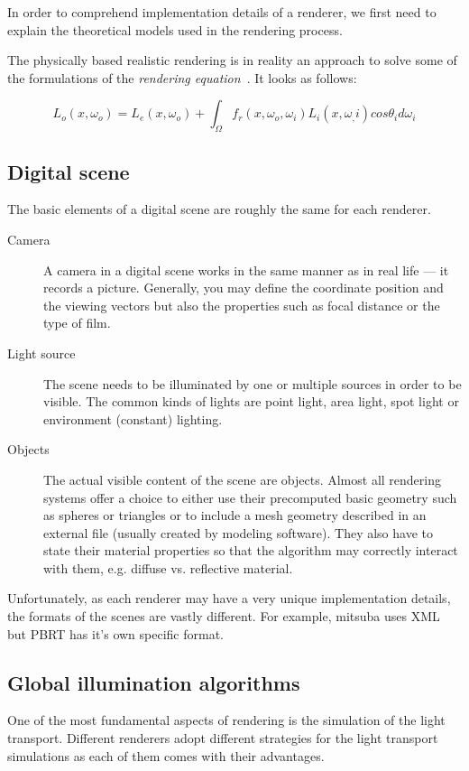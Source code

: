 In order to comprehend implementation details of a renderer, we first need to explain the theoretical models used in the rendering process.

The physically based realistic rendering is in reality an approach to solve some of the formulations of the \emph{rendering equation}~\cite{kajiya1986rendering}. It looks as follows:

\begin{equation}
L_o(x,\omega_o)=L_e(x,\omega_o)+\int_{\Omega}f_r(x,\omega_o,\omega_i) L_i(x,\omega_,i) cos\theta_i d\omega_i
\end{equation}

\subsection{Digital scene}

The basic elements of a digital scene are roughly the same for each renderer. 

\begin{description}
	\item[Camera] A camera in a digital scene works in the same manner as in real life --- it records a picture. Generally, you may define the coordinate position and the viewing vectors but also the properties such as focal distance or the type of film.
	\item[Light source] The scene needs to be illuminated by one or multiple sources in order to be visible. The common kinds of lights are point light, area light, spot light or environment (constant) lighting. 
	\item[Objects] The actual visible content of the scene are objects. Almost all rendering systems offer a choice to either use their precomputed basic geometry such as spheres or triangles or to include a mesh geometry described in an external file (usually created by modeling software). They also have to state their material properties so that the algorithm may correctly interact with them, e.g. diffuse vs. reflective material.
\end{description}

Unfortunately, as each renderer may have a very unique implementation details, the formats of the scenes are vastly different. For example, mitsuba uses XML but PBRT has it's own specific format.


\subsection{Global illumination algorithms}

One of the most fundamental aspects of rendering is the simulation of the light transport. Different renderers adopt different strategies for the light transport simulations as each of them comes with their advantages.

